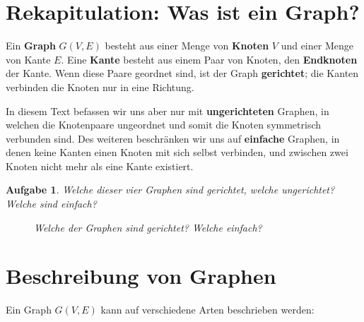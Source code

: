 \documentclass[12pt,a4paper]{report}
\theoremstyle{break}
\newtheorem{exercise}{Aufgabe}[chapter]
\theoremstyle{plain}
\begin{document}
\section{Rekapitulation: Was ist ein Graph?}

Ein \textbf{Graph} $G(V,E)$ besteht aus einer Menge von
\textbf{Knoten} $V$ und einer Menge von Kante $E$. Eine \textbf{Kante}
besteht aus einem Paar von Knoten, den \textbf{Endknoten} der
Kante. Wenn diese Paare geordnet sind, ist der Graph
\textbf{gerichtet}; die Kanten verbinden die Knoten nur in eine
Richtung. 

In diesem Text befassen wir uns aber nur mit
\textbf{ungerichteten} Graphen, in welchen die Knotenpaare ungeordnet
und somit die Knoten symmetrisch verbunden sind.  Des weiteren
beschr\"{a}nken wir uns auf \textbf{einfache} Graphen, in denen keine
Kanten einen Knoten mit sich selbst verbinden, und zwischen zwei
Knoten nicht mehr als eine Kante existiert.

\begin{exercise}\label{exgerichtet}
Welche dieser vier Graphen sind gerichtet, welche ungerichtet? Welche
sind einfach?
\begin{figure}[H]
\begin{subfigure}[b]{0.23\textwidth}
\caption{}
\end{subfigure}
\begin{subfigure}[b]{0.23\textwidth}
\caption{}
\end{subfigure}
\begin{subfigure}[b]{0.23\textwidth}
\caption{}
\end{subfigure}
\begin{subfigure}[b]{0.23\textwidth}
\caption{}
\end{subfigure}
\caption{Welche der Graphen sind gerichtet? Welche einfach?}
\end{figure}
\end{exercise}

\section{Beschreibung von Graphen}
\label{Beschreibung}
\noindent Ein Graph $G(V,E)$ kann auf verschiedene Arten beschrieben werden:
\end{document}
